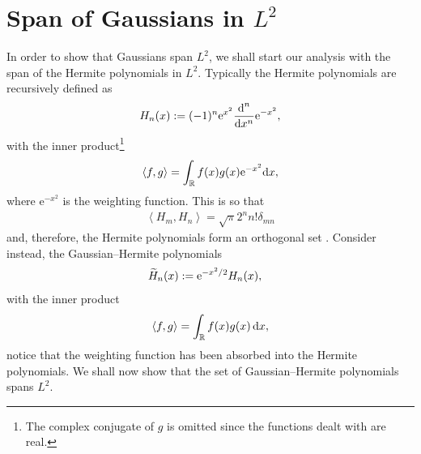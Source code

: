 \section{Span of Gaussians in $L^2$}
In order to show that Gaussians span $L^2$, we shall start our analysis with the span of the Hermite polynomials in $L^2$. Typically the Hermite polynomials are recursively defined as \cite{conway, courant, teuwen}
\begin{align*}
H_n(x) := (-1)^n \textrm{e}^{x^2} \diff[n]{}{x} \textrm{e}^{-x^2},
\end{align*}
with the inner product\footnote{The complex conjugate of $g$ is omitted since the functions dealt with are real.}
\begin{align*}
\left< f, g \right> = \int_\mathbb{R} f(x) g(x) \textrm{e}^{-x^2} \df x,
\end{align*}
where $\textrm{e}^{-x^2}$ is the weighting function. This is so that 
\begin{align*}
\left< H_m, H_n \right> = \sqrt{\pi} 2^n n! \delta_{mn}
\end{align*}
and, therefore, the Hermite polynomials form an orthogonal set \cite{courant, hochstrasser, kreyszig, szego, teuwen}. Consider instead, the Gaussian--Hermite polynomials
\begin{align*}
\Her{n}{x} &:= \textrm{e}^{-x^2/2} H_n(x),
\end{align*}
with the inner product
\begin{align*}
\left< f, g \right> = \int_\mathbb{R} f(x) g(x) \, \df x,
\end{align*}
notice that the weighting function has been absorbed into the Hermite polynomials. We shall now show that the set of Gaussian--Hermite polynomials spans $L^2$. \\

